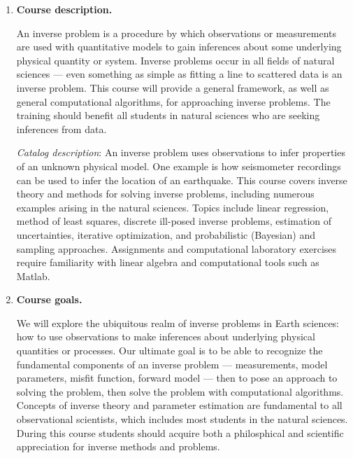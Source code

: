 \documentclass[10pt,titlepage,fleqn]{article}
\begin{document}
\begin{enumerate}
\begin{enumerate}
\end{enumerate}

\item {\bf Course description.}

An inverse problem is a procedure by which observations or measurements are used with quantitative models to gain inferences about some underlying physical quantity or system. Inverse problems occur in all fields of natural sciences --- even something as simple as fitting a line to scattered data is an inverse problem. This course will provide a general framework, as well as general computational algorithms, for approaching inverse problems. The training should benefit all students in natural sciences who are seeking inferences from data.

{\em Catalog description}: An inverse problem uses observations to infer properties of an unknown physical model. One example is how seismometer recordings can be used to infer the location of an earthquake. This course covers inverse theory and methods for solving inverse problems, including numerous examples arising in the natural sciences. Topics include linear regression, method of least squares, discrete ill-posed inverse problems, estimation of uncertainties, iterative optimization, and probabilistic (Bayesian) and sampling approaches. Assignments and computational laboratory exercises require familiarity with linear algebra and computational tools such as Matlab. 


\item {\bf Course goals.}

We will explore the ubiquitous realm of inverse problems in Earth sciences: how to use observations to make inferences about underlying physical quantities or processes. Our ultimate goal is to be able to recognize the fundamental components of an inverse problem --- measurements, model parameters, misfit function, forward model --- then to pose an approach to solving the problem, then solve the problem with computational algorithms. Concepts of inverse theory and parameter estimation are fundamental to all observational scientists, which includes most students in the natural sciences. During this course students should acquire both a philosphical and scientific appreciation for inverse methods and problems.


\end{enumerate}
\end{document}
